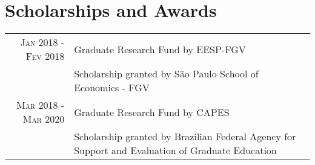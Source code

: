 \documentclass[a4paper,10pt]{article}
\begin{document}

\section{Scholarships and Awards}
\begin{tabular}{r|p{10.5cm}}
    \textsc{Jan} 2018 - \textsc{Fev} 2018 & Graduate Research Fund by EESP-FGV\\
    &\footnotesize{Scholarship granted by São Paulo School of Economics - FGV}
    \\
    \textsc{Mar} 2018 - \textsc{Mar} 2020 & Graduate Research Fund by CAPES\\
    &\footnotesize{Scholarship granted by Brazilian Federal Agency for Support and Evaluation of Graduate Education}
\end{tabular}
\end{document}
